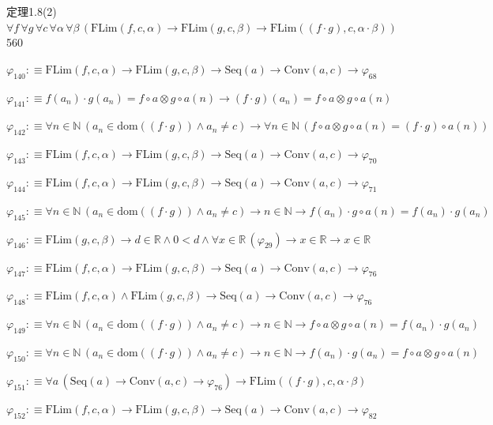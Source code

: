 \begin{fullproof}{定理1.8(2)}{$\forall f\,\forall g\,\forall c\,\forall \alpha\,\forall \beta\,(\mathrm{FLim}(f,c,\alpha) \to \mathrm{FLim}(g,c,\beta) \to \mathrm{FLim}((f \cdot g),c,\alpha \cdot \beta))$}{560}
\begin{abbrevlist}
\item $\varphi_{140} :\equiv \mathrm{FLim}(f,c,\alpha) \to \mathrm{FLim}(g,c,\beta) \to \mathrm{Seq}(a) \to \mathrm{Conv}(a,c) \to \varphi_{68}$
\item $\varphi_{141} :\equiv f(a_{n}) \cdot g(a_{n}) = f \circ a \otimes g \circ a(n) \to (f \cdot g)(a_{n}) = f \circ a \otimes g \circ a(n)$
\item $\varphi_{142} :\equiv \forall n \in \mathbb{N}\,(a_{n} \in \mathrm{dom}((f \cdot g)) \land a_{n} \neq c) \to \forall n \in \mathbb{N}\,(f \circ a \otimes g \circ a(n) = (f \cdot g) \circ a(n))$
\item $\varphi_{143} :\equiv \mathrm{FLim}(f,c,\alpha) \to \mathrm{FLim}(g,c,\beta) \to \mathrm{Seq}(a) \to \mathrm{Conv}(a,c) \to \varphi_{70}$
\item $\varphi_{144} :\equiv \mathrm{FLim}(f,c,\alpha) \to \mathrm{FLim}(g,c,\beta) \to \mathrm{Seq}(a) \to \mathrm{Conv}(a,c) \to \varphi_{71}$
\item $\varphi_{145} :\equiv \forall n \in \mathbb{N}\,(a_{n} \in \mathrm{dom}((f \cdot g)) \land a_{n} \neq c) \to n \in \mathbb{N} \to f(a_{n}) \cdot g \circ a(n) = f(a_{n}) \cdot g(a_{n})$
\item $\varphi_{146} :\equiv \mathrm{FLim}(g,c,\beta) \to d \in \mathbb{R} \land 0 < d \land \forall x \in \mathbb{R}\,(\varphi_{29}) \to x \in \mathbb{R} \to x \in \mathbb{R}$
\item $\varphi_{147} :\equiv \mathrm{FLim}(f,c,\alpha) \to \mathrm{FLim}(g,c,\beta) \to \mathrm{Seq}(a) \to \mathrm{Conv}(a,c) \to \varphi_{76}$
\item $\varphi_{148} :\equiv \mathrm{FLim}(f,c,\alpha) \land \mathrm{FLim}(g,c,\beta) \to \mathrm{Seq}(a) \to \mathrm{Conv}(a,c) \to \varphi_{76}$
\item $\varphi_{149} :\equiv \forall n \in \mathbb{N}\,(a_{n} \in \mathrm{dom}((f \cdot g)) \land a_{n} \neq c) \to n \in \mathbb{N} \to f \circ a \otimes g \circ a(n) = f(a_{n}) \cdot g(a_{n})$
\item $\varphi_{150} :\equiv \forall n \in \mathbb{N}\,(a_{n} \in \mathrm{dom}((f \cdot g)) \land a_{n} \neq c) \to n \in \mathbb{N} \to f(a_{n}) \cdot g(a_{n}) = f \circ a \otimes g \circ a(n)$
\item $\varphi_{151} :\equiv \forall a\,(\mathrm{Seq}(a) \to \mathrm{Conv}(a,c) \to \varphi_{76}) \to \mathrm{FLim}((f \cdot g),c,\alpha \cdot \beta)$
\item $\varphi_{152} :\equiv \mathrm{FLim}(f,c,\alpha) \to \mathrm{FLim}(g,c,\beta) \to \mathrm{Seq}(a) \to \mathrm{Conv}(a,c) \to \varphi_{82}$

\end{abbrevlist}
\end{fullproof}
